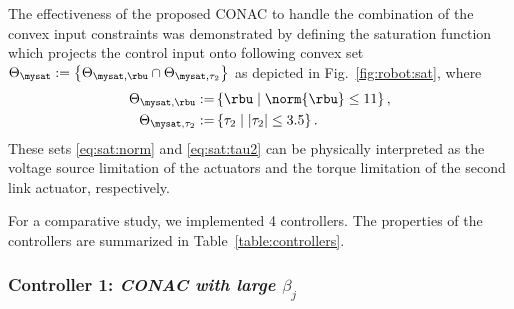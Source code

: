 \documentclass[lettersize,journal]{IEEEtran}
\begin{document}
The effectiveness of the proposed CONAC to handle the combination of the convex input constraints was demonstrated by defining the saturation function which projects the control input onto following convex set $\Theta_{\mysat}:=\left\{\Theta_{\mysat, {\rbu}}\cap\Theta_{\mysat, {\tau_2}}\right\}$ as depicted in Fig.~\ref{fig:robot:sat}, where
\begin{subequations}
    \begin{align}
        \Theta_{\mysat, {\rbu}}
        :=&
        \left\{
            \rbu
            \mid
            \norm{\rbu} \le 
            11
        \right\}
        \label{eq:sat:norm}
        ,
        \\
        \Theta_{\mysat, {\tau_2}}
        :=&
        \left\{
            \tau_2
            \mid
            \vert{\tau_2}\vert \le 
            3.5
        \right\}
        .
        \label{eq:sat:tau2}
    \end{align}
    \label{eq:sat}%
\end{subequations}
These sets \eqref{eq:sat:norm} and \eqref{eq:sat:tau2} can be physically interpreted as the voltage source limitation of the actuators and the torque limitation of the second link actuator, respectively.

\hfill

For a comparative study, we implemented 4 controllers.
The properties of the controllers are summarized in Table~\ref{table:controllers}.

\subsubsection*{Controller 1:  \textit{CONAC with large $\beta_j$}}
\end{document}
